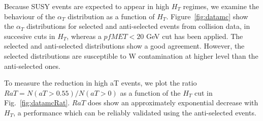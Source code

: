 Because SUSY events are expected to appear in high $H_{T}$ regimes, we examine the behaviour of the $\alpha_{T}$ distribution as a function of $H_{T}$. Figure~\ref{fig:datamc} show the $\alpha_{T}$ distributions for selected and anti-selected events from collision data, in succesive cuts in $H_{T}$, whereas a $pfMET < 20$ GeV cut has been applied. The selected and anti-selected distributions show a good agreement. However, the selected distributions are susceptible to W contamination at higher level than the anti-selected ones. 

To measure the reduction in high aT events, we plot the ratio $ RaT  = N(aT>0.55)/ N(aT>0) $ as a function of the $H_{T}$ cut in Fig.~\ref{fig:datamcRat}. $RaT$ does show an approximately exponential decrease with $H_{T}$, a performance which can be reliably validated using the anti-selected events. 

